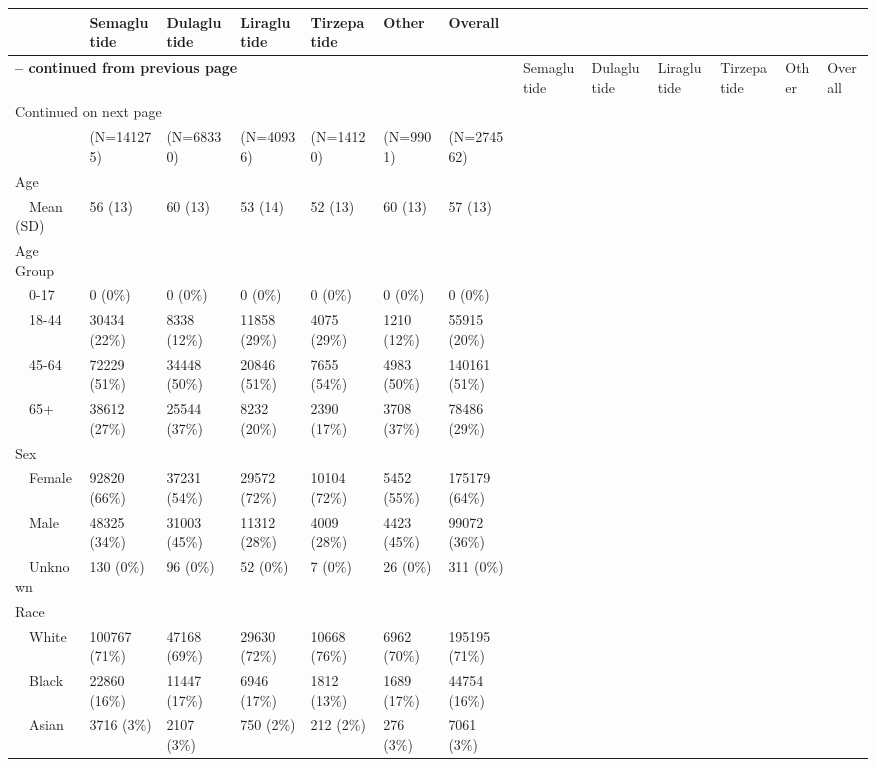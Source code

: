 \begin{longtable}{p{}p{}p{}p{}p{}p{}p{}}
   & Semaglutide & Dulaglutide & Liraglutide & Tirzepatide & Other & Overall \\ 
  \hline 
\endfirsthead 
\multicolumn{7}{p{\textwidth}}{{ \bfseries \tablename \thetable{} -- continued from previous page}} \ 
\hline Feature & Semaglutide & Dulaglutide & Liraglutide & Tirzepatide & Other & Overall \\ \hline 
\endhead 
\hline \multicolumn{7}{p{\textwidth}}{{Continued on next page}} \\ \hline 
\endfoot 
\hline 
\endlastfoot 
 \hline
 & (N=141275) & (N=68330) & (N=40936) & (N=14120) & (N=9901) & (N=274562) \\ 
  Age &  &  &  &  &  &  \\ 
    Mean (SD) & 56 (13) & 60 (13) & 53 (14) & 52 (13) & 60 (13) & 57 (13) \\ 
  Age Group &  &  &  &  &  &  \\ 
    0-17 & 0 (0\%) & 0 (0\%) & 0 (0\%) & 0 (0\%) & 0 (0\%) & 0 (0\%) \\ 
    18-44 & 30434 (22\%) & 8338 (12\%) & 11858 (29\%) & 4075 (29\%) & 1210 (12\%) & 55915 (20\%) \\ 
    45-64 & 72229 (51\%) & 34448 (50\%) & 20846 (51\%) & 7655 (54\%) & 4983 (50\%) & 140161 (51\%) \\ 
    65+ & 38612 (27\%) & 25544 (37\%) & 8232 (20\%) & 2390 (17\%) & 3708 (37\%) & 78486 (29\%) \\ 
  Sex &  &  &  &  &  &  \\ 
    Female & 92820 (66\%) & 37231 (54\%) & 29572 (72\%) & 10104 (72\%) & 5452 (55\%) & 175179 (64\%) \\ 
    Male & 48325 (34\%) & 31003 (45\%) & 11312 (28\%) & 4009 (28\%) & 4423 (45\%) & 99072 (36\%) \\ 
    Unknown & 130 (0\%) & 96 (0\%) & 52 (0\%) & 7 (0\%) & 26 (0\%) & 311 (0\%) \\ 
  Race &  &  &  &  &  &  \\ 
    White & 100767 (71\%) & 47168 (69\%) & 29630 (72\%) & 10668 (76\%) & 6962 (70\%) & 195195 (71\%) \\ 
    Black & 22860 (16\%) & 11447 (17\%) & 6946 (17\%) & 1812 (13\%) & 1689 (17\%) & 44754 (16\%) \\ 
    Asian & 3716 (3\%) & 2107 (3\%) & 750 (2\%) & 212 (2\%) & 276 (3\%) & 7061 (3\%) \\ 

\end{longtable}
